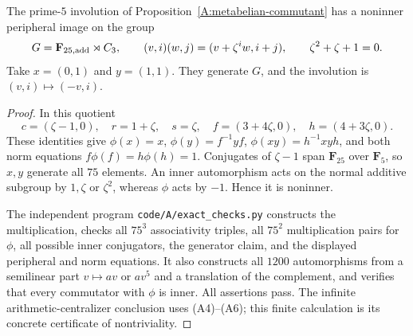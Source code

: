 \begin{proposition}
\label{A:finite-metabelian}
The prime-$5$ involution of Proposition~\ref{A:metabelian-commutant}
has a noninner peripheral image on the group
\[
 G=\mathbf F_{25,\rm add}\rtimes C_3,
 \qquad (v,i)(w,j)=(v+\zeta^i w,i+j),
 \qquad \zeta^2+\zeta+1=0.
\]
Take $x=(0,1)$ and $y=(1,1)$.  They generate $G$, and
the involution is $(v,i)\mapsto(-v,i)$.
\end{proposition}
\begin{proof}
In this quotient
\[
 c=(\zeta-1,0),\quad r=1+\zeta,\quad s=\zeta,
 \quad f=(3+4\zeta,0),\quad h=(4+3\zeta,0).
\]
These identities give $\phi(x)=x$,
$\phi(y)=f^{-1}yf$, $\phi(xy)=h^{-1}xyh$, and both
norm equations $f\phi(f)=h\phi(h)=1$.  Conjugates of
$\zeta-1$ span $\mathbf F_{25}$ over $\mathbf F_5$, so
$x,y$ generate all $75$ elements.  An inner automorphism
acts on the normal additive subgroup by $1,\zeta$ or
$\zeta^2$, whereas $\phi$ acts by $-1$.  Hence it is
noninner.

The independent program \texttt{code/A/exact\_checks.py}
constructs the multiplication, checks all $75^3$
associativity triples, all $75^2$ multiplication pairs
for $\phi$, all possible inner conjugators, the generator
claim, and the displayed peripheral and norm equations.
It also constructs all $1200$ automorphisms from a
semilinear part $v\mapsto a v$ or $a v^5$ and a
translation of the complement, and verifies that every
commutator with $\phi$ is inner.  All assertions pass.
The infinite arithmetic-centralizer conclusion uses
(A4)--(A6); this finite calculation is its concrete
certificate of nontriviality.
\end{proof}


